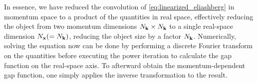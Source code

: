 \documentclass[../../main.tex]{subfiles}
\begin{document}
In essence, we have reduced the convolution of \eqref{eq:linearized_eliashberg} in momentum space to a product of the quantities in real space, effectively reducing the object from two momentum dimensions $N_{\textbf{k}}\times N_{\textbf{k}}$ to a single real-space dimension $N_{\textbf{x}}(=N_{\textbf{k}})$, reducing the object size by a factor $N_{\textbf{k}}$. Numerically, solving the equation now can be done by performing a discrete Fourier transform on the quantities before executing the power iteration to calculate the gap function on the real-space axis. To afterward obtain the momentum-dependent gap function, one simply applies the inverse transformation to the result.
\end{document}
